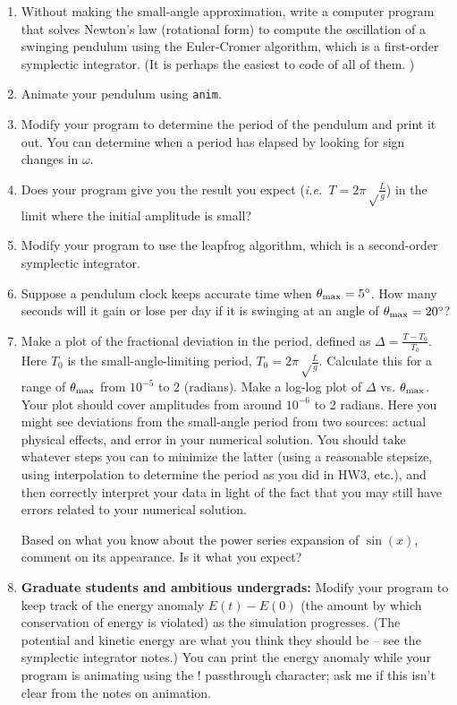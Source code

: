 \documentclass[12pt]{article}
\newcommand{\ie}{{\em i.e.\ }}
\begin{document}
\begin{enumerate}

\item Without making the small-angle approximation, 
write a computer program that solves Newton's law (rotational form) to compute the oscillation of a swinging pendulum using the Euler-Cromer algorithm, which 
is a first-order symplectic integrator. (It is perhaps the easiest to code of all of them.
)
\item Animate your pendulum using {\tt anim}.

\item Modify your program to determine the period of the pendulum and print it out. You can determine when a period has elapsed by looking for sign changes in $\omega$.

\item Does your program give you the result you expect (\ie $T=2\pi\sqrt\frac{L}{g}$) in the limit where the initial amplitude is small?

\item Modify your program to use the leapfrog algorithm, which is a second-order symplectic integrator.

\item Suppose a pendulum clock keeps accurate time when $\theta_{\rm max}=5^\circ$. How many seconds will it gain or lose per day if it is swinging at an angle of  $\theta_{\rm max}=20^\circ$?

\item Make a plot of the fractional deviation in the period, defined as $\Delta = \frac{T-T_0}{T_0}$. Here $T_0$ is the small-angle-limiting period, $T_0=2\pi\sqrt\frac{L}{g}$. Calculate this for a range of $\theta_{\rm max}$ from $10^{-5}$ to 2 (radians). Make a log-log plot of $\Delta$ vs. $\theta_{\rm max}$. Your plot should
cover amplitudes from around $10^{-6}$ to 2 radians. Here you might see
deviations from the small-angle period from two sources: actual physical effects, and error in your numerical solution. You should take whatever steps you can to minimize
the latter (using a reasonable stepsize, using interpolation to determine the period as you did in HW3, etc.), and then correctly interpret your data in light of the fact
that you may still have errors related to your numerical solution.

Based on what you know about the power series expansion of $\sin(x)$, comment on its appearance. Is it what you expect?

\item {\bf Graduate students and ambitious undergrads:} Modify your program to keep track of the energy anomaly $E(t) - E(0)$ (the amount by which conservation of energy is violated)
as the simulation progresses. (The potential and kinetic energy are what you think they should be -- see the symplectic integrator notes.) You can print the energy anomaly while your program is animating
using the ! passthrough character; ask me if this isn't clear from the notes on animation.


\end{enumerate}
\end{document}
